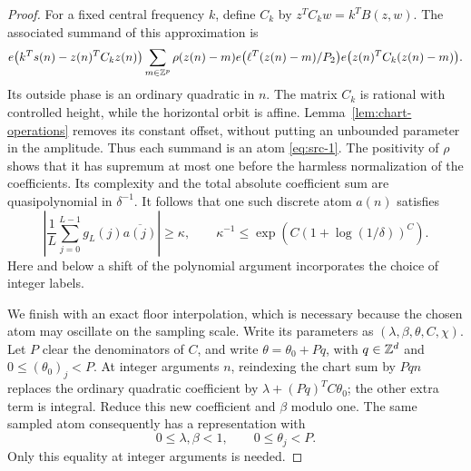 \begin{proof}
For a fixed central frequency \(k\), define \(C_k\) by
\(z^TC_kw=k^TB(z,w)\).
The associated summand of this approximation is
\[
 e\bigl(k^Ts(n)-z(n)^TC_kz(n)\bigr)
 \sum_{m\in\mathbb Z^p}
     \rho(z(n)-m)e\bigl(\ell^T(z(n)-m)/P_2\bigr)
     e\bigl(z(n)^TC_k(z(n)-m)\bigr).
\]
Its outside phase is an ordinary quadratic in \(n\).
The matrix \(C_k\) is rational with controlled height, while
the horizontal orbit is affine.
Lemma~\ref{lem:chart-operations} removes its constant offset,
without putting an unbounded parameter in the amplitude.
Thus each summand is an atom \eqref{eq:src-1}.
The positivity of \(\rho\) shows that it has supremum at most one
before the harmless normalization of the coefficients.
Its complexity and the total absolute coefficient sum are
quasipolynomial in \(\delta^{-1}\).
It follows that one such discrete atom \(a(n)\) satisfies
\[
 \left|\frac1L\sum_{j=0}^{L-1}
                g_L(j)\overline{a(j)}\right|\ge\kappa,
 \qquad
 \kappa^{-1}\le
 \exp\!\left(C(1+\log(1/\delta))^C\right).
\]
Here and below a shift of the polynomial argument incorporates the
choice of integer labels.

We finish with an exact floor interpolation, which is necessary because
the chosen atom may oscillate on the sampling scale.
Write its parameters as \((\lambda,\beta,\theta,C,\chi)\).
Let \(P\) clear the denominators of \(C\), and write
\(\theta=\theta_0+Pq\), with \(q\in\mathbb Z^d\) and
\(0\le(\theta_0)_j<P\).
At integer arguments \(n\), reindexing the chart sum by \(Pqn\)
replaces the ordinary quadratic coefficient by
\(\lambda+(Pq)^TC\theta_0\); the other extra term is integral.
Reduce this new coefficient and \(\beta\) modulo one.
The same sampled atom consequently has a representation with
\[
 0\le\lambda,\beta<1,\qquad
 0\le\theta_j<P.
\]
Only this equality at integer arguments is needed.


\end{proof}
